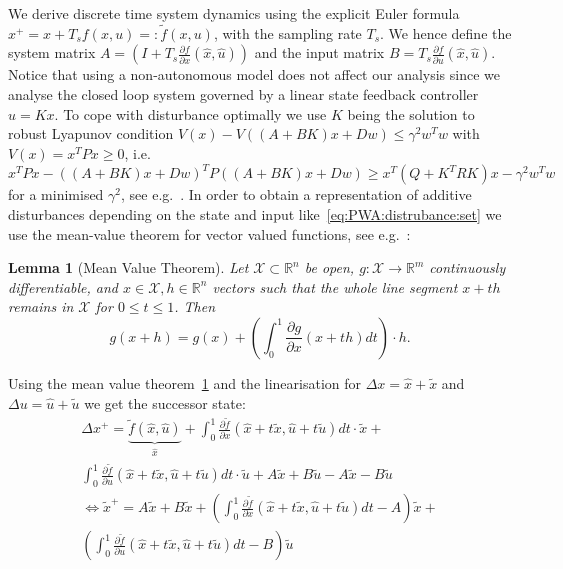 \documentclass[letterpaper, 10pt, conference]{ieeeconf} %
\newtheorem{thm}{Lemma}[section]
\begin{document}
%
We derive discrete time system dynamics using the explicit Euler formula $x^+=x+T_s f(x,u) =:\tilde f(x,u)$,
with the sampling rate $T_s$. We hence define the system matrix $A = (I+T_s\frac{\partial f}{\partial x}(\hat x,\hat u))$
and the input matrix $B = T_s \frac{\partial f}{\partial u}(\hat x,\hat u)$. 
Notice that using a non-autonomous model does not affect our analysis since we analyse the closed loop system
governed by a linear state feedback controller $u=Kx$. To cope with disturbance optimally we use $K$ 
being the solution to robust Lyapunov condition $V(x)-V((A+BK)x+Dw)\leq \gamma^2w^Tw$ with $V(x)=x^T P x\geq0$, i.e.
$x^TPx - ((A+BK)x+Dw)^TP((A+BK)x+Dw)\geq x^T(Q+K^TRK)x -\gamma^2 w^Tw$ for a minimised $\gamma^2$, 
see e.g.~\cite{Boyd:94}.
In order to obtain a 
representation of additive disturbances depending on the state and input like~\eqref{eq:PWA:distrubance:set}
we use the mean-value theorem for vector valued functions, see e.g.~\cite{Apostol:1974}:
%
%
\begin{thm}[Mean Value Theorem]\label{thm:mean:value:theorem}
Let $\mathcal X\subset\mathbb R^n$ be open, $g : \mathcal X \rightarrow\mathbb R^m$ continuously differentiable, 
and $x \in\mathcal X, h \in\mathbb R^n$ vectors such that the 
whole line segment $x + th$ remains in $\mathcal X$ for $0 \leq t \leq 1$. Then
\begin{equation}
	g(x+h) = g(x) + \left(\int_0^1 \frac{\partial g}{\partial x}(x+th)dt\right)\cdot h.
\end{equation}
\end{thm}
%
%
Using the mean value theorem~\ref{thm:mean:value:theorem}
and the linearisation for $\Delta x = \hat x + \tilde x$ and $\Delta u = \hat u + \tilde u$ we
get the successor state:
%
\begin{equation}
	\begin{split}
	\Delta x^+ = \underbrace{\tilde f(\hat x, \hat u)}_{\hat x} + \int_0^1\frac{\partial\tilde 
	f}{\partial x}(\hat x + t\tilde x
	,\hat u + t\tilde u)dt\cdot \tilde x +\\
	 \int_0^1\frac{\partial\tilde f}{\partial u}(\hat x + t\tilde x
	,\hat u + t\tilde u)dt\cdot \tilde u + A \tilde x + B \tilde u - A \tilde x - B\tilde u\\
	\Leftrightarrow \tilde x^+ = A\tilde x + B \tilde x +\left(
	\int_0^1\frac{\partial\tilde f}{\partial x}(\hat x + t\tilde x,\hat u + t\tilde u)dt - A
	\right)\tilde x + \\ \left(
	\int_0^1\frac{\partial\tilde f}{\partial u}(\hat x + t\tilde x,\hat u + t\tilde u)dt - B
	\right)\tilde u
	\end{split}
\end{equation}
\end{document}
